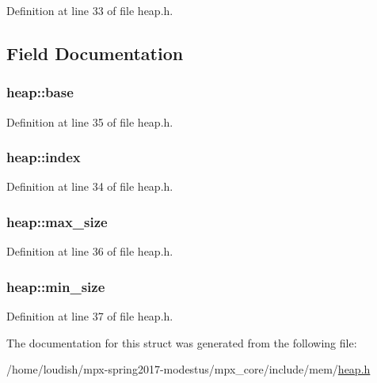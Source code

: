 Definition at line 33 of file heap.\+h.



\subsection{Field Documentation}
\subsubsection[{\texorpdfstring{base}{base}}]{ heap\+::base}\hypertarget{structheap_a744634662f1ffdb4d85632e68c063e51}{}\label{structheap_a744634662f1ffdb4d85632e68c063e51}


Definition at line 35 of file heap.\+h.

\subsubsection[{\texorpdfstring{index}{index}}]{ heap\+::index}\hypertarget{structheap_a8fe6ce2a8b45088990071e9b1d35add2}{}\label{structheap_a8fe6ce2a8b45088990071e9b1d35add2}


Definition at line 34 of file heap.\+h.

\subsubsection[{\texorpdfstring{max\+\_\+size}{max_size}}]{ heap\+::max\+\_\+size}\hypertarget{structheap_ad2e0262828735d6e437facbfce37d6b0}{}\label{structheap_ad2e0262828735d6e437facbfce37d6b0}


Definition at line 36 of file heap.\+h.

\subsubsection[{\texorpdfstring{min\+\_\+size}{min_size}}]{ heap\+::min\+\_\+size}\hypertarget{structheap_a7b4422774c5ca7ac8ed5ddfe95f5c8ec}{}\label{structheap_a7b4422774c5ca7ac8ed5ddfe95f5c8ec}


Definition at line 37 of file heap.\+h.



The documentation for this struct was generated from the following file\+:\begin{DoxyCompactItemize}
\item 
/home/loudish/mpx-\/spring2017-\/modestus/mpx\+\_\+core/include/mem/\hyperlink{heap_8h}{heap.\+h}\end{DoxyCompactItemize}
